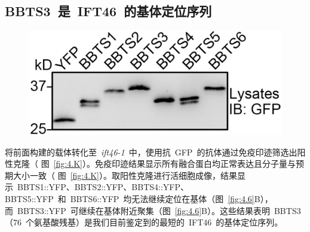 \subsection{BBTS3\ 是\ IFT46\ 的基体定位序列}
\begin{figure}[!ht]
\centering
\graphicspath{{figures/}}
\includegraphics[width=\textwidth-80mm]{fig4-K.jpg}
{
\par}
\end{figure}

将前面构建的载体转化至\ \textit{ift46-1}\ 中，使用抗\ GFP\ 的抗体通过免疫印迹筛选出阳性克隆（
图\ \ref{fig:4.K}）。免疫印迹结果显示所有融合蛋白均正常表达且分子量与预期大小一致（
图\ \ref{fig:4.K}）。取阳性克隆进行活细胞成像，结果显示\ BBTS1::YFP、BBTS2::YFP、BBTS4::YFP、 BBTS5::YFP\ 和\ BBTS6::YFP\ 均无法继续定位在基体（图\ \ref{fig:4.6}B），而\ BBTS3::YFP\ 可继续在基体附近聚集（图\ \ref{fig:4.6}B）。这些结果表明\ BBTS3（76\ 个氨基酸残基）是我们目前鉴定到的最短的\ IFT46\ 的基体定位序列。

